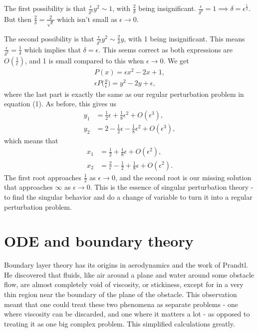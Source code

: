 \documentclass[12pt]{article}
\begin{document}
The first possibility is that $\frac{\epsilon}{\delta^2} y^2 \sim 1$,
with $\frac{2}{\delta}$ being insignificant.
$\frac{\epsilon}{\delta^2} = 1 \implies \delta =
\epsilon^{\frac{1}{2}}$.
But then $\frac{2}{\delta} = \frac{2}{\sqrt{\epsilon}}$ which isn't
small as $\epsilon \to 0$.

The second possibility is that
$\frac{\epsilon}{\delta^2} y^2 \sim \frac{2}{\delta} y$, with 1 being
insignificant. This means
$\frac{\epsilon}{\delta^2} = \frac{1}{\delta}$ which implies that
$\delta = \epsilon$. This seems correct as both expressions are
$O(\frac{1}{e})$, and 1 is small compared to this when
$\epsilon \to 0$. We get
\begin{align}
P(x) = \epsilon x^2 - 2x + 1, \\
\epsilon P\Big(\frac{y}{\epsilon}\Big) = y^2 - 2 y + \epsilon,
\end{align}
where the last part is exactly the same as our regular perturbation
problem in equation (1). As before, this gives us
\begin{align}
y_1 &= \frac{1}{2} \epsilon + \frac{1}{8} \epsilon^2 + O(\epsilon^3), \\
y_2 &= 2 - \frac{1}{2} \epsilon - \frac{1}{8} \epsilon^2 + O(\epsilon^3),
\end{align}
which means that
\begin{align}
x_1 &= \frac{1}{2} + \frac{1}{8} \epsilon + O(\epsilon^2), \\
x_2 &= \frac{2}{\epsilon} - \frac{1}{2} + \frac{1}{8} \epsilon + O(\epsilon^2).
\end{align}
The first root approaches $\frac{1}{2}$ as $\epsilon \to 0$, and the
second root is our missing solution that approaches $\infty$ as
$\epsilon \to 0$. This is the essence of singular perturbation theory
- to find the singular behavior and do a change of variable to turn it
into a regular perturbation problem.

\newpage
\section{ODE and boundary theory}

Boundary layer theory has its origins in aerodynamics and the work of
Prandtl. He discovered that fluids, like air around a plane and water
around some obstacle flow, are almost completely void of viscosity, or
stickiness, except for in a very thin region near the boundary of the
plane of the obstacle. This observation meant that one could treat
these two phenomena as separate problems - one where viscosity can be
discarded, and one where it matters a lot - as opposed to treating it
as one big complex problem. This simplified calculations greatly.
\end{document}
